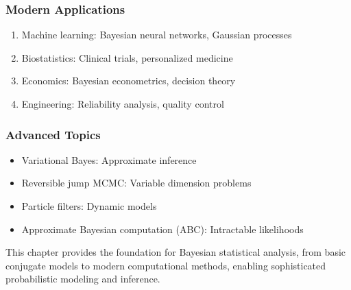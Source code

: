 \subsubsection{Modern Applications}

\begin{enumerate}
	\item Machine learning: Bayesian neural networks, Gaussian processes
	\item Biostatistics: Clinical trials, personalized medicine
	\item Economics: Bayesian econometrics, decision theory
	\item Engineering: Reliability analysis, quality control
\end{enumerate}

\subsubsection{Advanced Topics}

\begin{itemize}
	\item Variational Bayes: Approximate inference
	\item Reversible jump MCMC: Variable dimension problems
	\item Particle filters: Dynamic models
	\item Approximate Bayesian computation (ABC): Intractable likelihoods
\end{itemize}

This chapter provides the foundation for Bayesian statistical analysis, from basic conjugate models to modern computational methods, enabling sophisticated probabilistic modeling and inference.

